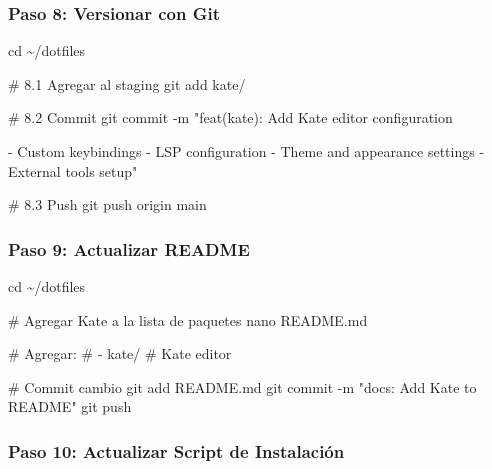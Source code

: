 \documentclass[
  doc,
  floatsintext,
  longtable,
  a4paper,
  nolmodern,
  notxfonts,
  notimes,
  12pt,
  colorlinks=true,linkcolor=blue,citecolor=blue,urlcolor=blue]{apa7}
\newenvironment{Shaded}{\begin{snugshade}}{\end{snugshade}}
\newcommand{\AttributeTok}[1]{\textcolor[rgb]{0.40,0.45,0.13}{#1}}
\newcommand{\BuiltInTok}[1]{\textcolor[rgb]{0.00,0.23,0.31}{#1}}
\newcommand{\CommentTok}[1]{\textcolor[rgb]{0.37,0.37,0.37}{#1}}
\newcommand{\FunctionTok}[1]{\textcolor[rgb]{0.28,0.35,0.67}{#1}}
\newcommand{\NormalTok}[1]{\textcolor[rgb]{0.00,0.23,0.31}{#1}}
\newcommand{\StringTok}[1]{\textcolor[rgb]{0.13,0.47,0.30}{#1}}
\begin{document}
\subsubsection{Paso 8: Versionar con
Git}\label{paso-8-versionar-con-git}

\begin{Shaded}
\begin{Highlighting}[]
\BuiltInTok{cd}\NormalTok{ \textasciitilde{}/dotfiles}

\CommentTok{\# 8.1 Agregar al staging}
\FunctionTok{git}\NormalTok{ add kate/}

\CommentTok{\# 8.2 Commit}
\FunctionTok{git}\NormalTok{ commit }\AttributeTok{{-}m} \StringTok{"feat(kate): Add Kate editor configuration}

\StringTok{{-} Custom keybindings}
\StringTok{{-} LSP configuration}
\StringTok{{-} Theme and appearance settings}
\StringTok{{-} External tools setup"}

\CommentTok{\# 8.3 Push}
\FunctionTok{git}\NormalTok{ push origin main}
\end{Highlighting}
\end{Shaded}

\subsubsection{Paso 9: Actualizar
README}\label{paso-9-actualizar-readme}

\begin{Shaded}
\begin{Highlighting}[]
\BuiltInTok{cd}\NormalTok{ \textasciitilde{}/dotfiles}

\CommentTok{\# Agregar Kate a la lista de paquetes}
\FunctionTok{nano}\NormalTok{ README.md}

\CommentTok{\# Agregar:}
\CommentTok{\# {-} kate/          \# Kate editor}

\CommentTok{\# Commit cambio}
\FunctionTok{git}\NormalTok{ add README.md}
\FunctionTok{git}\NormalTok{ commit }\AttributeTok{{-}m} \StringTok{"docs: Add Kate to README"}
\FunctionTok{git}\NormalTok{ push}
\end{Highlighting}
\end{Shaded}

\subsubsection{Paso 10: Actualizar Script de
Instalación}\label{paso-10-actualizar-script-de-instalaciuxf3n}
\end{document}
